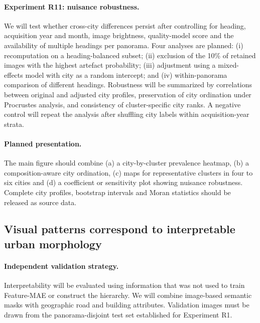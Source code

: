 \paragraph{Experiment R11: nuisance robustness.}
We will test whether cross-city differences persist after controlling for
heading, acquisition year and month, image brightness, quality-model score and
the availability of multiple headings per panorama. Four analyses are planned:
(i) recomputation on a heading-balanced subset; (ii) exclusion of the 10\% of
retained images with the highest artefact probability; (iii) adjustment using a
mixed-effects model with city as a random intercept; and (iv) within-panorama
comparison of different headings. Robustness will be summarized by correlations
between original and adjusted city profiles, preservation of city ordination
under Procrustes analysis, and consistency of cluster-specific city ranks. A
negative control will repeat the analysis after shuffling city labels within
acquisition-year strata.

\paragraph{Planned presentation.}
The main figure should combine (a) a city-by-cluster prevalence heatmap, (b) a
composition-aware city ordination, (c) maps for representative clusters in
four to six cities and (d) a coefficient or sensitivity plot showing nuisance
robustness. Complete city profiles, bootstrap intervals and Moran statistics
should be released as source data.

\subsection{Visual patterns correspond to interpretable urban morphology}
\label{sec:results_morphology}

\paragraph{Independent validation strategy.}
Interpretability will be evaluated using information that was not used to train
Feature-MAE or construct the hierarchy. We will combine image-based semantic
masks with geographic road and building attributes. Validation images must be
drawn from the panorama-disjoint test set established for Experiment R1.

